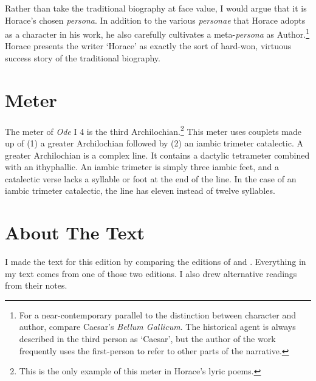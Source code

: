 Rather than take the traditional biography at face value, I would argue that it is Horace's chosen \textit{persona}.  In addition to the various \textit{personae} that Horace adopts as a character in his work, he also carefully cultivates a meta-\textit{persona} as Author.\footnote{For a near-contemporary parallel to the distinction between character and author, compare Caesar's \textit{Bellum Gallicum}.  The historical agent is always described in the third person as `Caesar', but the author of the work frequently uses the first-person to refer to other parts of the narrative.}  Horace presents the writer `Horace' as exactly the sort of hard-won, virtuous success story of the traditional biography.






\section*{Meter}

The meter of \textit{Ode} I 4 is the third Archilochian.\footnote{This is the only example of this meter in Horace's lyric poems.} This meter uses couplets made up of (1) a greater Archilochian followed by (2) an iambic trimeter catalectic.  A greater Archilochian is a complex line.  It contains a dactylic tetrameter combined with an ithyphallic.  An iambic trimeter is simply three iambic feet, and a catalectic verse lacks a syllable or foot at the end of the line. In the case of an iambic trimeter catalectic, the line has eleven instead of twelve syllables.\newline

\indent\metra{\m\mbb\m\mbb\m\mbb\m\bb\c\m\b\m\b\m\m}

\indent\indent\metra{\bm\m\b\m\m\c\m\b\m\b\m\m}\newline

\section*{About The Text}

I made the text for this edition by comparing the editions of \citet{sb1985} and \citet{klingner1959}. Everything in my text comes from one of those two editions. I also drew alternative readings from their notes.


